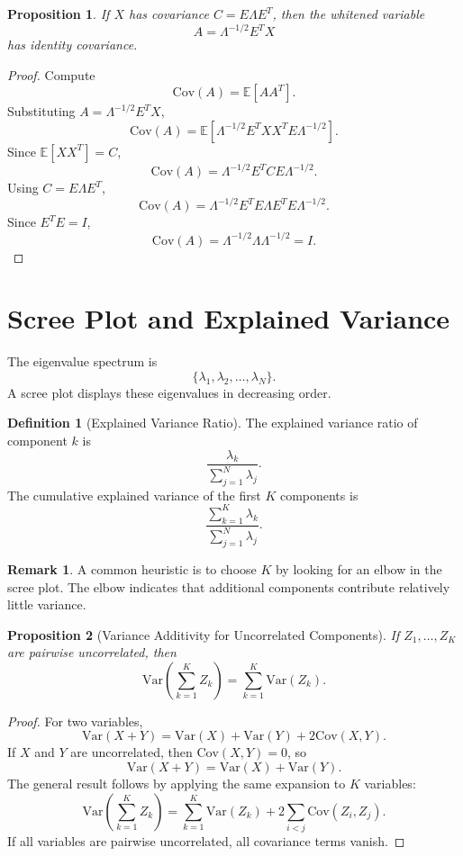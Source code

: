 \documentclass[12pt,oneside]{book}
\numberwithin{equation}{section}
\theoremstyle{definition}
\newtheorem{definition}{Definition}[section]
\newtheorem{remark}{Remark}[section]
\theoremstyle{plain}
\newtheorem{proposition}{Proposition}[section]
\theoremstyle{remark}
\newcommand{\E}{\mathbb{E}}
\newcommand{\Var}{\mathrm{Var}}
\newcommand{\Cov}{\mathrm{Cov}}
\begin{document}
\begin{proposition}
If $X$ has covariance $C=E\Lambda E^T$, then the whitened variable
\[
A=\Lambda^{-1/2}E^TX
\]
has identity covariance.
\end{proposition}

\begin{proof}
Compute
\[
\Cov(A)
=
\E[AA^T].
\]
Substituting $A=\Lambda^{-1/2}E^TX$,
\[
\Cov(A)
=
\E[\Lambda^{-1/2}E^TXX^TE\Lambda^{-1/2}].
\]
Since $\E[XX^T]=C$,
\[
\Cov(A)
=
\Lambda^{-1/2}E^TCE\Lambda^{-1/2}.
\]
Using $C=E\Lambda E^T$,
\[
\Cov(A)
=
\Lambda^{-1/2}E^TE\Lambda E^TE\Lambda^{-1/2}.
\]
Since $E^TE=I$,
\[
\Cov(A)
=
\Lambda^{-1/2}\Lambda\Lambda^{-1/2}
=
I.
\]
\end{proof}

\section{Scree Plot and Explained Variance}

The eigenvalue spectrum is
\[
\{\lambda_1,\lambda_2,\dots,\lambda_N\}.
\]
A scree plot displays these eigenvalues in decreasing order.

\begin{definition}[Explained Variance Ratio]
The explained variance ratio of component $k$ is
\[
\frac{\lambda_k}{\sum_{j=1}^N \lambda_j}.
\]
The cumulative explained variance of the first $K$ components is
\[
\frac{\sum_{k=1}^K \lambda_k}{\sum_{j=1}^N \lambda_j}.
\]
\end{definition}

\begin{remark}
A common heuristic is to choose $K$ by looking for an elbow in the scree plot. The elbow indicates that additional components contribute relatively little variance.
\end{remark}

\begin{proposition}[Variance Additivity for Uncorrelated Components]
If $Z_1,\dots,Z_K$ are pairwise uncorrelated, then
\[
\Var\left(\sum_{k=1}^K Z_k\right)
=
\sum_{k=1}^K \Var(Z_k).
\]
\end{proposition}

\begin{proof}
For two variables,
\[
\Var(X+Y)
=
\Var(X)+\Var(Y)+2\Cov(X,Y).
\]
If $X$ and $Y$ are uncorrelated, then $\Cov(X,Y)=0$, so
\[
\Var(X+Y)=\Var(X)+\Var(Y).
\]
The general result follows by applying the same expansion to $K$ variables:
\[
\Var\left(\sum_{k=1}^K Z_k\right)
=
\sum_{k=1}^K \Var(Z_k)
+
2\sum_{i<j}\Cov(Z_i,Z_j).
\]
If all variables are pairwise uncorrelated, all covariance terms vanish.
\end{proof}
\end{document}
